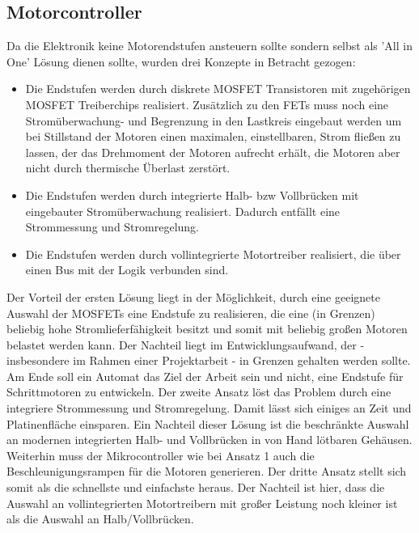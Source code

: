 \documentclass{scrartcl}
\begin{document}
\subsection{Motorcontroller}
\label{Motorcontroller}
Da die Elektronik keine Motorendstufen ansteuern sollte sondern selbst als 'All in One' Lösung dienen sollte, wurden drei Konzepte in Betracht gezogen:
\begin{itemize}
\item{Die Endstufen werden durch diskrete MOSFET Transistoren mit zugehörigen MOSFET Treiberchips realisiert. Zusätzlich zu den FETs muss noch eine Stromüberwachung- und Begrenzung in den Lastkreis eingebaut werden um bei Stillstand der Motoren einen maximalen, einstellbaren, Strom fließen zu lassen, der das Drehmoment der Motoren aufrecht erhält, die Motoren aber nicht durch thermische Überlast zerstört.}
\item{Die Endstufen werden durch integrierte Halb- bzw Vollbrücken mit eingebauter Stromüberwachung realisiert. Dadurch entfällt eine Strommessung und Stromregelung.}
\item{Die Endstufen werden durch vollintegrierte Motortreiber realisiert, die über einen Bus mit der Logik verbunden sind.}
\end{itemize}
Der Vorteil der ersten Lösung liegt in der Möglichkeit, durch eine geeignete Auswahl der MOSFETs eine Endstufe zu realisieren, die eine (in Grenzen) beliebig hohe Stromlieferfähigkeit besitzt und somit mit beliebig großen Motoren belastet werden kann. Der Nachteil liegt im Entwicklungsaufwand, der - insbesondere im Rahmen einer Projektarbeit - in Grenzen gehalten werden sollte. Am Ende soll ein Automat das Ziel der Arbeit sein und nicht, eine Endstufe für Schrittmotoren zu entwickeln. \newline
Der zweite Ansatz löst das Problem durch eine integriere Strommessung und Stromregelung. Damit lässt sich einiges an Zeit und Platinenfläche einsparen. Ein Nachteil dieser Lösung ist die beschränkte Auswahl an modernen integrierten Halb- und Vollbrücken in von Hand lötbaren Gehäusen. Weiterhin muss der Mikrocontroller wie bei Ansatz 1 auch die Beschleunigungsrampen für die Motoren generieren. \newline
Der dritte Ansatz stellt sich somit als die schnellste und einfachste heraus. Der Nachteil ist hier, dass die Auswahl an vollintegrierten Motortreibern mit großer Leistung noch kleiner ist als die Auswahl an Halb/Vollbrücken. \\
\\
\end{document}
